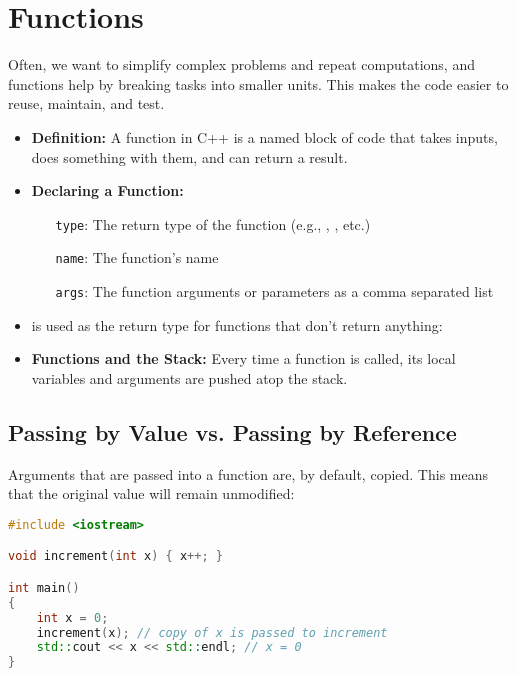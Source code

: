 \documentclass{article}
\title{\thistitle}
\author{\me}
\date{\today}
\begin{document}
\maketitle
\tableofcontents
\pagebreak

\section{Functions}

\noindent
Often, we want to simplify complex problems and repeat computations, and functions help by breaking tasks into smaller units. This makes the code easier to reuse, maintain, and test.

\begin{itemize}
	\item \textbf{Definition:} A function in C++ is a named block of code that takes inputs, does something with them, and can return a result.
	\item \textbf{Declaring a Function:} 
	\begin{itemize}
		\item[\texttt{type}:] The return type of the function (e.g., , , etc.)
		\item[\texttt{name}:] The function's name
		\item[\texttt{args}:] The function arguments or parameters as a comma separated list
	\end{itemize}
	\item {} is used as the return type for functions that don't return anything:
	\item \textbf{Functions and the Stack:} Every time a function is called, its local variables and arguments are pushed atop the stack.
\end{itemize}

\subsection{Passing by Value vs. Passing by Reference}

\noindent
Arguments that are passed into a function are, by default, copied. This means that the original value will remain unmodified:

\begin{lstlisting}[language=C++]
#include <iostream>

void increment(int x) { x++; }

int main()
{
	int x = 0;
	increment(x); // copy of x is passed to increment
	std::cout << x << std::endl; // x = 0
}
\end{lstlisting}
\end{document}

